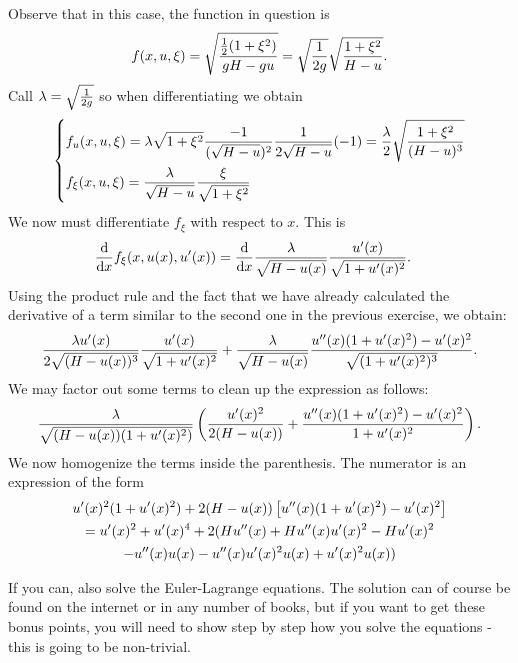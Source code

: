 \documentclass[12pt]{memoir}
\begin{document}
\begin{ptcbr}
Observe that in this case, the function in question is 
$$f(x,u,\xi)=\sqrt{\frac{\half(1+\xi^2)}{gH-gu}}=\sqrt{\frac{1}{2g}}\sqrt{\frac{1+\xi^2}{H-u}}.$$
Call $\lambda=\sqrt{\frac{1}{2g}}$ so when differentiating we obtain 
$$\left\lbrace
\begin{aligned}
    &f_u(x,u,\xi)=\lambda\sqrt{1+\xi^2}\frac{-1}{(\sqrt{H-u})^2}\frac{1}{2\sqrt{H-u}}(-1)=\frac{\lambda}{2}\sqrt{\frac{1+\xi^2}{(H-u)^3}}\\
    &f_\xi(x,u,\xi)=\frac{\lambda}{\sqrt{H-u}}\frac{\xi}{\sqrt{1+\xi^2}}
\end{aligned}
\right.
$$
We now must differentiate $f_\xi$ with respect to $x$. This is 
\begin{align*}
    \dv{x}f_{\xi}(x,u(x),u'(x))&=\dv{x}\frac{\lambda}{\sqrt{H-u(x)}}\frac{u'(x)}{\sqrt{1+u'(x)^2}}.
\end{align*}
Using the product rule and the fact that we have already calculated the derivative of a term similar to the second one in the previous exercise, we obtain:
$$\frac{\lambda u'(x)}{2\sqrt{(H-u(x))^3}}\frac{u'(x)}{\sqrt{1+u'(x)^2}}+\frac{\lambda}{\sqrt{H-u(x)}}\frac{u''(x)(1+u'(x)^2)-u'(x)^2}{\sqrt{(1+u'(x)^2)^3}}.$$
We may factor out some terms to clean up the expression as follows:
$$\frac{\lambda}{\sqrt{(H-u(x))(1+u'(x)^2)}}\left(\frac{u'(x)^2}{2(H-u(x))}+\frac{u''(x)(1+u'(x)^2)-u'(x)^2}{1+u'(x)^2}\right).$$
We now homogenize the terms inside the parenthesis. The numerator is an expression of the form 
\begin{gather*}
u'(x)^2(1+u'(x)^2)+2(H-u(x))\left\lbrack u''(x)(1+u'(x)^2)-u'(x)^2\right\rbrack\\
=u'(x)^2+u'(x)^4+2(Hu''(x)+Hu''(x)u'(x)^2-Hu'(x)^2\\
-u''(x)u(x)-u''(x)u'(x)^2u(x)+u'(x)^2u(x))
\end{gather*}
\end{ptcbr}

\begin{nonum-Ej}
    If you can, also solve the Euler-Lagrange equations. The solution can of course be found on the internet
or in any number of books, but if you want to get these bonus points, you will need to show step by step
how you solve the equations - this is going to be non-trivial.
\end{nonum-Ej}
\end{document}
